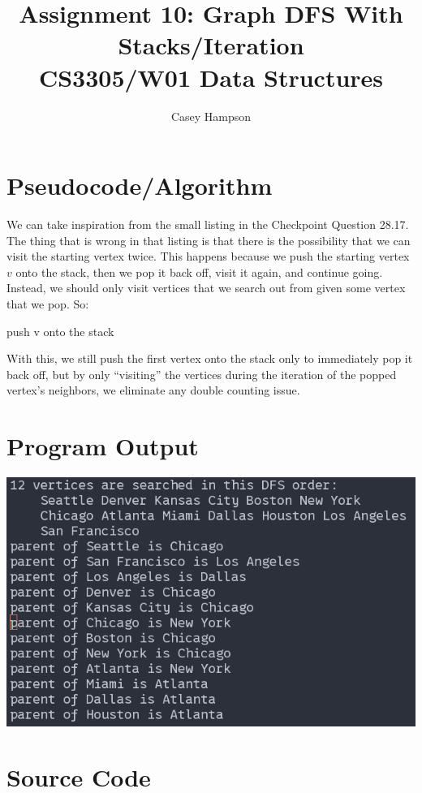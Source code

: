 \documentclass{article}
\title{Assignment 10: Graph DFS With Stacks/Iteration \\[8pt] CS3305/W01 Data Structures}
\author{Casey Hampson}
\begin{document}
\maketitle

\section*{Pseudocode/Algorithm}
We can take inspiration from the small listing in the Checkpoint Question 28.17. The thing that is wrong in that listing is that there is the possibility that we can visit the starting vertex twice. This happens because we push the starting vertex $v$ onto the stack, then we pop it back off, visit it again, and continue going. Instead, we should only visit vertices that we search out from given some vertex that we pop. So:

\begin{algorithm}[H]
  
  \BlankLine
  push v onto the stack\;
  \BlankLine
\end{algorithm}

With this, we still push the first vertex onto the stack only to immediately pop it back off, but by only ``visiting'' the vertices during the iteration of the popped vertex's neighbors, we eliminate any double counting issue.



\section*{Program Output}
\includegraphics[width=0.8\linewidth]{./res/1.png}


\pagebreak
\section*{Source Code}
\inputminted{java}{./A10.java} 
\end{document}
